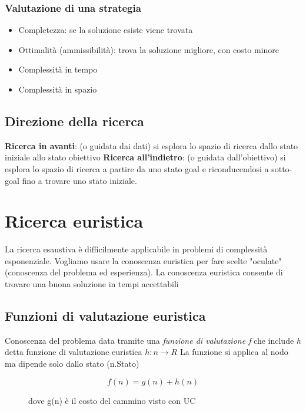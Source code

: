 \documentclass{article}
\begin{document}
\subsubsection{Valutazione di una strategia}
\begin{itemize}
    \item Completezza: se la soluzione esiste viene trovata
    \item Ottimalità (ammissibilità): trova la soluzione migliore, con costo minore
    \item Complessità in tempo
    \item Complessità in spazio
    
\end{itemize}

\subsection{Direzione della ricerca}
\textbf{Ricerca in avanti}: (o guidata dai dati) si esplora lo spazio di ricerca dallo stato iniziale allo stato obiettivo
\newline\textbf{Ricerca all'indietro}: (o guidata dall'obiettivo) si esplora lo spazio di ricerca a partire da uno stato goal e riconducendosi a sotto-goal fino a trovare uno stato iniziale.


\section{Ricerca euristica}
La ricerca esaustiva è difficilmente applicabile in problemi di complessità esponenziale. Vogliamo usare la conoscenza euristica per fare scelte "oculate" (conoscenza del problema ed esperienza).
La conoscenza euristica consente di trovare una buona soluzione in tempi accettabili

\subsection{Funzioni di valutazione euristica}
Conoscenza del problema data tramite una \textit{funzione di valutazione f} che include \textit{h} detta funzione di valutazione euristica
\newline $h : n \rightarrow R$
\newline La funzione si applica al nodo ma dipende solo dallo stato (n.Stato)
\begin{figure}
    \begin{equation}
        f(n) = g(n) + h(n)
    \end{equation}
\caption{dove g(n) è il costo del cammino visto con UC}
\end{figure}
\end{document}
